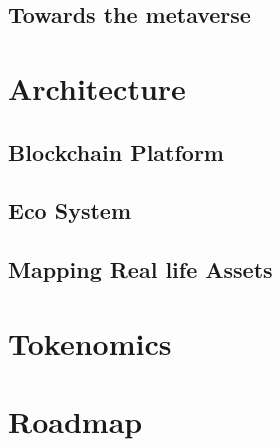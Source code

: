 \documentclass[12pt]{article}
\begin{document}
\subsection{Towards the metaverse}

\section{Architecture}

\subsection{Blockchain Platform}

\subsection{Eco System}

\subsection{Mapping Real life Assets}


\section{Tokenomics}

\section{Roadmap}



\end{document}
